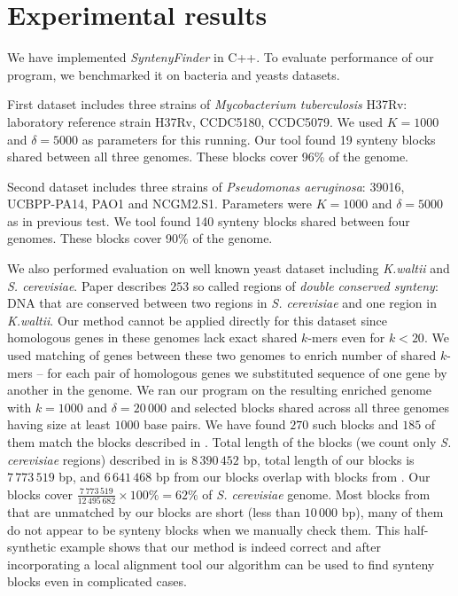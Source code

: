 \documentclass[a4paper, 12pt]{scrartcl}
\begin{document}
\section{Experimental results}
We have implemented \emph{SyntenyFinder} in C++. To evaluate performance of our program, we benchmarked it on bacteria and yeasts datasets.

First dataset includes three strains of \textit{Mycobacterium tuberculosis} H37Rv: laboratory reference strain H37Rv,
CCDC5180, CCDC5079. We used \(K = 1000\) and \(\delta = 5000\) as parameters for this running. Our tool found
19 synteny blocks shared between all three genomes. These blocks cover 96\% of the genome.

Second dataset includes three strains of \textit{Pseudomonas aeruginosa}: 39016, UCBPP-PA14, PAO1 and NCGM2.S1.
Parameters were \(K = 1000\) and \(\delta = 5000\) as in previous test. We tool found 140 synteny blocks shared between four genomes. 
These blocks cover 90\% of the genome.

We also performed evaluation on well known yeast dataset including \textit{K.waltii} and \textit{S. cerevisiae}. Paper \cite{Kellis2004} describes
\(253\) so called regions of \textit{double conserved synteny}: DNA that are conserved between two regions in \textit{S. cerevisiae} and one region in \textit{K.waltii}.
Our method cannot be applied directly for this dataset since homologous genes in these genomes lack exact shared \(k\)-mers even for \(k < 20\). We used
matching of genes between these two genomes to enrich number of shared \(k\)-mers -- for each pair of homologous genes we substituted sequence of one
gene by another in the genome. We ran our program on the resulting enriched genome with \(k = 1000\) and \(\delta = 20 \,000\) and selected blocks shared
across all three genomes having size at least \(1 000\) base pairs. We have found \(270\) such blocks and \(185\) of them match the blocks described in \cite{Kellis2004}.
Total length of the blocks (we count only \textit{S. cerevisiae} regions) described in \cite{Kellis2004} is \(8  \, 390  \, 452\) bp, total length of our blocks is \(7 \, 773 \, 519\) bp, and \(6 \, 641 \, 468\) bp
from our blocks overlap with blocks from \cite{Kellis2004}. Our blocks cover  \(\frac{7 \, 773 \, 519}{12 \, 495 \, 682} \times 100 \% = 62\% \) of \textit{S. cerevisiae} genome. Most
blocks from \cite{Kellis2004} that are unmatched by our blocks are short (less than \(10 \, 000\) bp), many of them do not appear to be
synteny blocks when we manually check them. This half-synthetic example shows that
our method is indeed correct and after incorporating a local alignment tool our algorithm can be used to find synteny blocks even in complicated cases.
\end{document}
